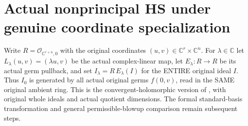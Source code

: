 \section{Actual nonprincipal HS under genuine coordinate specialization}

Write $R=\mathcal O_{\mathbb C^{r+n},0}$ with the original coordinates
$(u,v)\in\mathbb C^r\times\mathbb C^n$. For $\lambda\in\mathbb C$ let
$L_\lambda(u,v)=(\lambda u,v)$ be the actual complex-linear map, let
$E_\lambda:R\to R$ be its actual germ pullback, and set
$I_\lambda=R\,E_\lambda(I)$ for the ENTIRE original ideal $I$.
Thus $I_0$ is generated by all actual original germs $f(0,v)$, read in the
SAME original ambient ring. This is the convergent-holomorphic version of
\cite[Lemma 7.25, p.~270]{bierstone-milman97-invent-math}, with original
whole ideals and actual quotient dimensions. The formal standard-basis
transformation and general permissible-blowup comparison remain subsequent
steps.

